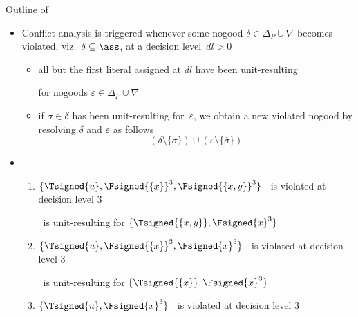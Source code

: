 \begin{frame}{Outline of \ConflictAnalysis}
  \begin{itemize}
  \item<2-> Conflict analysis is triggered whenever
    some nogood $\delta\in\Delta_P\cup\nabla$
    becomes violated, viz.\ $\delta\subseteq\ass$,
    at a decision level~$\mathit{dl}>0$
    \begin{itemize}\normalsize
    \item<3-> all but the first literal assigned at $\mathit{dl}$
      have been unit-resulting
      \par
      for nogoods $\varepsilon\in\Delta_P\cup\nabla$
    \item<4-> if $\sigma\in\delta$ has been unit-resulting for~$\varepsilon$,
      we obtain a new violated nogood
      by resolving $\delta$ and $\varepsilon$ as follows
      \[
        (\delta\setminus\{\sigma\})\cup(\varepsilon\setminus\{\overline{\sigma}\})
      \]
    \end{itemize}
  \item<5->  \
    \begin{enumerate}\normalsize
    \item<6-> $\{\Tsigned{u},\Fsigned{\{x\}}^3,\Fsigned{\{x,y\}}^3\}$          \ is violated at decision level 3
      \par\smallskip\pause[7]
       \ is unit-resulting for $\{\Tsigned{\{x,y\}},\Fsigned{x}^3\}$
      \smallskip
    \item<8-> $\{\Tsigned{u},\Fsigned{\{x\}}^3,\Fsigned{x}^3\}$       \pause[9]\ is violated at decision level 3
      \par\smallskip\pause[10]
       \ is unit-resulting for $\{\Tsigned{\{x\}},\Fsigned{x}^3\}$
      \smallskip
    \item<11-> $\{\Tsigned{u},\Fsigned{x}^3\}$                                 \ is violated at decision level 3
    \end{enumerate}
  \end{itemize}
\end{frame}
